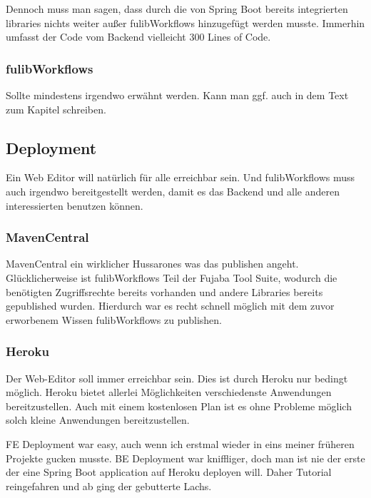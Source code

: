 Dennoch muss man sagen, dass durch die von Spring Boot bereits integrierten libraries nichts weiter
außer fulibWorkflows hinzugefügt werden musste.
Immerhin umfasst der Code vom Backend vielleicht 300 Lines of Code.

\subsubsection{fulibWorkflows}
\todo
Sollte mindestens irgendwo erwähnt werden.
Kann man ggf. auch in dem Text zum Kapitel schreiben.

\subsection{Deployment}\label{subsec:deployment}
\todo
Ein Web Editor will natürlich für alle erreichbar sein.
Und fulibWorkflows muss auch irgendwo bereitgestellt werden, damit es das Backend und alle anderen
interessierten benutzen können.

\subsubsection{MavenCentral}\label{subsubsec:mavencentral}
\todo
MavenCentral ein wirklicher Hussarones was das publishen angeht.
Glücklicherweise ist fulibWorkflows Teil der Fujaba Tool Suite, wodurch die benötigten
Zugriffsrechte bereits vorhanden und andere Libraries bereits gepublished wurden.
Hierdurch war es recht schnell möglich mit dem zuvor erworbenem Wissen fulibWorkflows
zu publishen.

\subsubsection{Heroku}\label{subsubsec:heroku}
\todo
Der Web-Editor soll immer erreichbar sein.
Dies ist durch Heroku nur bedingt möglich.
Heroku bietet allerlei Möglichkeiten verschiedenste Anwendungen bereitzustellen.
Auch mit einem kostenlosen Plan ist es ohne Probleme möglich solch kleine Anwendungen bereitzustellen.

FE Deployment war easy, auch wenn ich erstmal wieder in eins meiner früheren Projekte gucken musste.
BE Deployment war kniffliger, doch man ist nie der erste der eine Spring Boot application
auf Heroku deployen will.
Daher Tutorial reingefahren und ab ging der gebutterte Lachs.